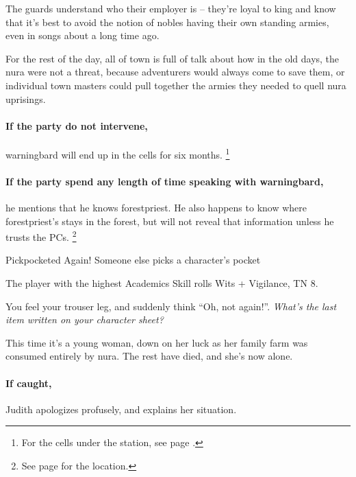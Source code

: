\begin{multicols}{2}
\begin{boxtext}
\end{boxtext}

The guards understand who their employer is -- they're loyal to \gls{king} and know that it's best to avoid the notion of nobles having their own standing armies, even in songs about a long time ago.

For the rest of the day, all of \gls{town} is full of talk about how in the old days, the nura were not a threat, because adventurers would always come to save them, or individual town masters could pull together the armies they needed to quell nura uprisings.

\paragraph{If the party do not intervene,}
\gls{warningbard} will end up in the cells for six months.
\footnote{For the cells under the  station, see page \pageref{guardstation}.}

\warningbard

\paragraph{If the party spend any length of time speaking with \gls{warningbard},}
he mentions that he knows \gls{forestpriest}.
He also happens to know where \gls{forestpriest}'s stays in the forest, but will not reveal that information unless he trusts the PCs.
\footnote{See page \pageref{lostcity} for the location.}

{Pickpocketed Again!}%
{Someone else picks a character's pocket}%

The player with the highest Academics Skill rolls Wits + Vigilance, TN 8.

\begin{boxtext}

  You feel your trouser leg, and suddenly think ``Oh, not again!''.  \textit{What's the last item written on your character sheet?}

\end{boxtext}

This time it's a young woman, down on her luck as her family farm was consumed entirely by nura.
The rest have died, and she's now alone.

\paragraph{If caught,}
Judith apologizes profusely, and explains her situation.



\end{multicols}

\stopcontents[Town]
\stopcontents[sq]
